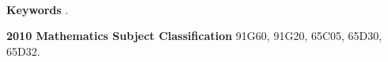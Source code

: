 
\

\textbf{Keywords} .

\textbf{2010 Mathematics Subject Classification} 	91G60, 	91G20, 65C05, 65D30, 65D32.